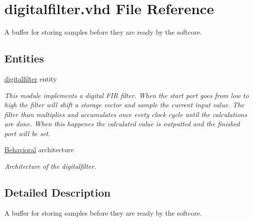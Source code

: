 \hypertarget{digitalfilter_8vhd}{\section{digitalfilter.\-vhd File Reference}
\label{digitalfilter_8vhd}
}


A buffer for storing samples before they are ready by the softcore.  


\subsection*{Entities}
\begin{DoxyCompactItemize}
\item 
\hyperlink{classdigitalfilter}{digitalfilter} entity
\begin{DoxyCompactList}\small\item\em This module implements a digital F\-I\-R filter. When the start port goes from low to high the filter will shift a storage vector and sample the current input value. The filter than multiplies and accumulates once evety clock cycle until the calculations are done. When this happenes the calculated value is outputted and the finished port will be set. \end{DoxyCompactList}\item 
\hyperlink{classdigitalfilter_1_1Behavioral}{Behavioral} architecture
\begin{DoxyCompactList}\small\item\em Architecture of the digitalfilter. \end{DoxyCompactList}\end{DoxyCompactItemize}


\subsection{Detailed Description}
A buffer for storing samples before they are ready by the softcore. 